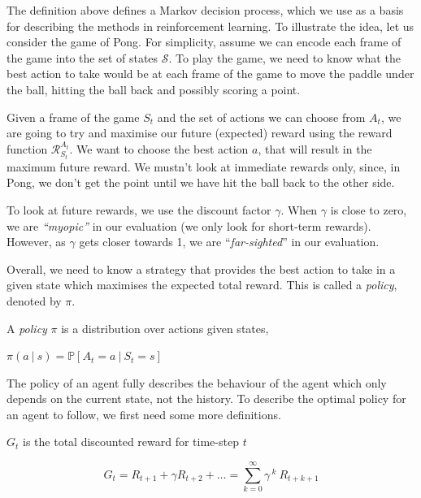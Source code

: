 The definition above defines a Markov decision process, which we use as a basis for describing the methods in reinforcement learning. To illustrate the idea, let us consider the game of Pong. For simplicity, assume we can encode each frame of the game into the set of states $\mathcal{S}$. To play the game, we need to know what the best action to take would be at each frame of the game to move the paddle under the ball, hitting the ball back and possibly scoring a point.

Given a frame of the game $S_t$ and the set of actions we can choose from $A_t$, we are going to try and maximise our future (expected) reward using the reward function $\mathcal{R}_{S_t}^{A_t}$. We want to choose the best action $a$, that will result in the maximum future reward. We mustn't look at immediate rewards only, since, in Pong, we don't get the point until we have hit the ball back to the other side.

To look at future rewards, we use the discount factor $\gamma$. When $\gamma$ is close to zero, we are \textit{``myopic''} in our evaluation (we only look for short-term rewards). However, as $\gamma$ gets closer towards 1, we are ``\textit{far-sighted}'' in our evaluation.

Overall, we need to know a strategy that provides the best action to take in a given state which maximises the expected total reward. This is called a \textit{policy}, denoted by $\pi$.

\begin{defn}
	A \textit{policy} $\pi$ is a distribution over actions given states,
	\begin{center}
		$\pi(a~|~s)=\mathbb{P}[A_t=a~|~S_t=s]$
	\end{center}
\end{defn}

The policy of an agent fully describes the behaviour of the agent \cite{davidsilver-course} which only depends on the current state, not the history. To describe the optimal policy for an agent to follow, we first need some more definitions.

\begin{defn}
	$G_t$ is the total discounted reward for time-step $t$
	\vspace*{-7mm}
	\begin{center}
		$$G_t = R_{t+1} + \gamma R_{t+2} + \dots = \sum_{k=0}^{\infty}\gamma^{~k}~R_{t+k+1}$$
	\end{center}
\end{defn}

